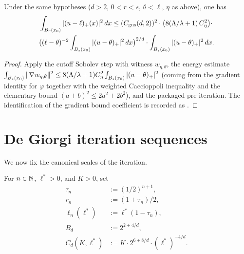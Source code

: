 \begin{theorem}
\label{thm:deGiorgi_preiter_on_concentricBalls_of_ballPosPart}
\leanok
{}
Under the same hypotheses ($d > 2$, $0 < r < s$, $\theta < \ell$,
$\eta$ as above), one has
\begin{multline*}
  \int_{B_{r}(x_0)} |(u-\ell)_+(x)|^2 \, dx
  \le (C_{\mathrm{gns}}(d,2))^2
    \cdot \bigl(8(\Lambda/\lambda + 1)\, C_\eta^2\bigr) \cdot \\
    \bigl((\ell - \theta)^{-2}
       \int_{B_{s}(x_0)} |(u-\theta)_+|^2 \, dx\bigr)^{2/d}
    \cdot \int_{B_{s}(x_0)} |(u-\theta)_+|^2 \, dx.
\end{multline*}
\end{theorem}

\begin{proof}
\leanok
{}

Apply the cutoff Sobolev step with witness $w_{\eta,\theta}$, the
energy estimate $\int_{B_{s}(x_0)} \|\nabla w_{\eta,\theta}\|^2 \le
8(\Lambda/\lambda+1) C_\eta^2 \int_{B_{s}(x_0)} |(u-\theta)_+|^2$
(coming from the gradient identity for $\varphi$ together with the
weighted Caccioppoli inequality and the elementary bound
$(a+b)^2 \le 2a^2 + 2b^2$), and the packaged pre-iteration. The
identification of the gradient bound coefficient is recorded as
.
\end{proof}

\section{De Giorgi iteration sequences}

We now fix the canonical scales of the iteration.

\begin{definition}
\label{def:deGiorgiTail}
\leanok
For $n \in \mathbb{N}$, $\ell^* > 0$, and $K > 0$, set
\begin{align*}
  \tau_n &:= (1/2)^{n+1}, \\
  r_n &:= (1 + \tau_n)/2, \\
  \ell_n(\ell^*) &:= \ell^* (1 - \tau_n), \\
  B_d &:= 2^{2 + 4/d}, \\
  C_d(K, \ell^*) &:= K \cdot 2^{6 + 8/d} \cdot (\ell^*)^{-4/d}.
\end{align*}
\end{definition}

